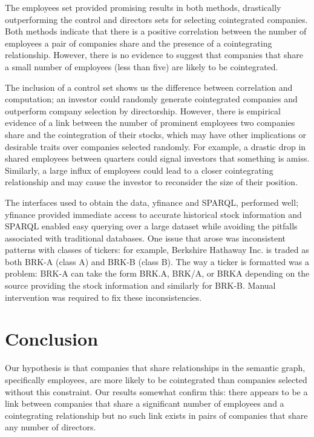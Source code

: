 \documentclass{UoYCSproject}
\begin{document}
The employees set provided promising results in both methods, drastically outperforming the control and directors sets for selecting cointegrated companies. Both methods indicate that there is a positive correlation between the number of employees a pair of companies share and the presence of a cointegrating relationship. However, there is no evidence to suggest that companies that share a small number of employees (less than five) are likely to be cointegrated.

The inclusion of a control set shows us the difference between correlation and computation; an investor could randomly generate cointegrated companies and outperform company selection by directorship. However, there is empirical evidence of a link between the number of prominent employees two companies share and the cointegration of their stocks, which may have other implications or desirable traits over companies selected randomly. For example, a drastic drop in shared employees between quarters could signal investors that something is amiss. Similarly, a large influx of employees could lead to a closer cointegrating relationship and may cause the investor to reconsider the size of their position.

The interfaces used to obtain the data, yfinance and SPARQL, performed well; yfinance provided immediate access to accurate historical stock information and SPARQL enabled easy querying over a large dataset while avoiding the pitfalls associated with traditional databases. One issue that arose was inconsistent patterns with classes of tickers: for example, Berkshire Hathaway Inc. is traded as both BRK-A (class A) and BRK-B (class B). The way a ticker is formatted was a problem: BRK-A can take the form BRK.A, BRK/A, or BRKA depending on the source providing the stock information and similarly for BRK-B. Manual intervention was required to fix these inconsistencies.

\chapter{Conclusion}
\label{cha:conclusion}

Our hypothesis is that companies that share relationships in the semantic graph, specifically employees, are more likely to be cointegrated than companies selected without this constraint. Our results somewhat confirm this: there appears to be a link between companies that share a significant number of employees and a cointegrating relationship but no such link exists in pairs of companies that share any number of directors.
\end{document}

